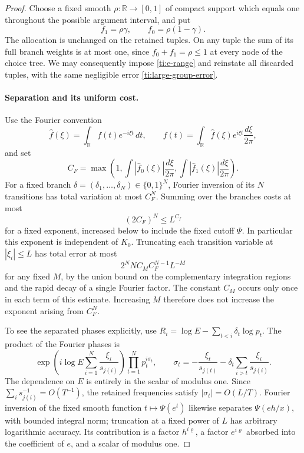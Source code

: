 \begin{proof}
Choose a fixed smooth $\rho:\mathbb R\to[0,1]$ of compact support
which equals one throughout the possible argument interval, and put
\[
              f_1=\rho\gamma,\qquad f_0=\rho(1-\gamma).
\]
The allocation is unchanged on the retained tuples. On any tuple the
sum of its full branch weights is at most one, since
$f_0+f_1=\rho\le1$ at every node of the choice tree. We may consequently
impose \eqref{ti:e-range} and reinstate all discarded tuples, with the
same negligible error \eqref{ti:large-group-error}.

\paragraph{Separation and its uniform cost.}
Use the Fourier convention
\[
 \widehat f(\xi)=\int_{\mathbb R}f(t)e^{-i\xi t}\,dt,
 \qquad f(t)=\int_{\mathbb R}\widehat f(\xi)e^{i\xi t}
                                    \frac{d\xi}{2\pi},
\]
and set
\[
 C_F=\max\left(1,
       \int|\widehat f_0(\xi)|\frac{d\xi}{2\pi},
       \int|\widehat f_1(\xi)|\frac{d\xi}{2\pi}\right).
\]
For a fixed branch $\delta=(\delta_1,\ldots,\delta_N)\in\{0,1\}^N$,
Fourier inversion of its $N$ transitions has total variation at most
$C_F^N$. Summing over the branches costs at most
\begin{equation}\label{ti:fourier-cost}
                         (2C_F)^N\le L^{C_f}
\end{equation}
for a fixed exponent, increased below to include the fixed cutoff
$\Psi$. In particular this exponent is independent of $K_0$.
Truncating each transition variable at $|\xi_i|\le L$ has total error
at most
\begin{equation}\label{ti:fourier-tail}
                  2^N N C_M C_F^{N-1}L^{-M}
\end{equation}
for any fixed $M$, by the union bound on the complementary integration
regions and the rapid decay of a single Fourier factor. The constant
$C_M$ occurs only once in each term of this estimate. Increasing $M$
therefore does not increase the exponent arising from $C_F^N$.

To see the separated phases explicitly, use
$R_i=\log E-\sum_{t<i}\delta_t\log p_t$. The product of the Fourier
phases is
\begin{equation}\label{ti:slot-frequencies}
 \exp\left(i\log E\sum_{i=1}^N\frac{\xi_i}{s_{j(i)}}\right)
       \prod_{t=1}^N p_t^{i\sigma_t},\qquad
 \sigma_t=-\frac{\xi_t}{s_{j(t)}}
           -\delta_t\sum_{i>t}\frac{\xi_i}{s_{j(i)}}.
\end{equation}
The dependence on $E$ is entirely in the scalar of modulus one.
Since $\sum_i s_{j(i)}^{-1}=O(T^{-1})$, the retained frequencies
satisfy $|\sigma_t|=O(L/T)$. Fourier inversion of the fixed smooth
function $t\mapsto\Psi(e^t)$ likewise separates $\Psi(eh/x)$,
with bounded integral norm; truncation at a fixed power of $L$ has
arbitrary logarithmic accuracy. Its contribution is a factor
$h^{i\varrho}$, a factor $e^{i\varrho}$ absorbed into the coefficient
of $e$, and a scalar of modulus one.


\end{proof}
